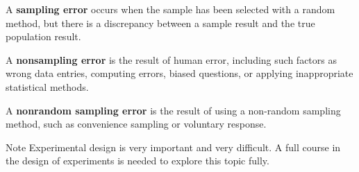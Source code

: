 \documentclass{beamer}
\begin{document}
\begin{frame}
\begin{definition}
A \textbf{sampling error} occurs when the sample has been selected with a random method, but there is a discrepancy between a sample result and the true population result.
\end{definition}\pause

\begin{definition}
A \textbf{nonsampling error} is the result of human error, including such factors as wrong data entries, computing errors, biased questions, or applying inappropriate statistical methods.
\end{definition}\pause

\begin{definition}
A \textbf{nonrandom sampling error} is the result of using a non-random sampling method, such as convenience sampling or voluntary response.
\end{definition}\pause

\begin{block}{Note}
Experimental design is very important and very difficult. A full course in the design of experiments is needed to explore this topic fully.
\end{block}
\end{frame}
\end{document}
